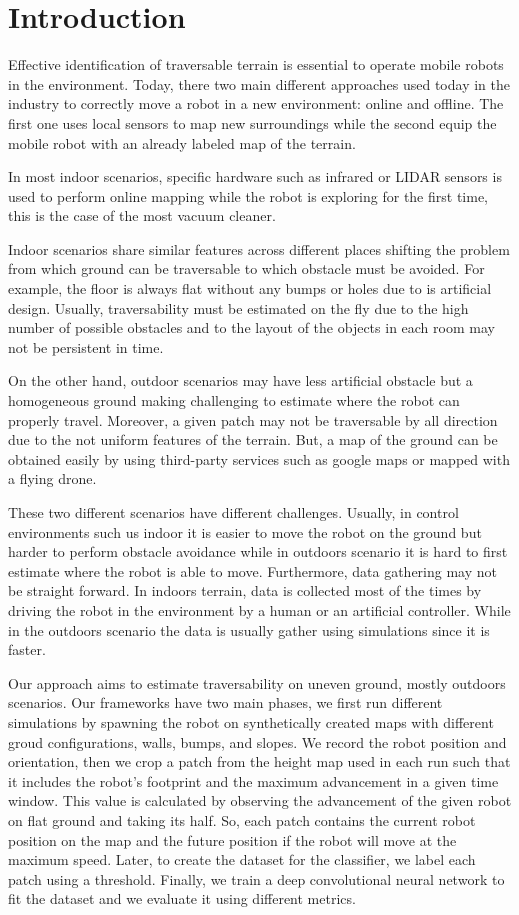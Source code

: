 \documentclass[../document.tex]{subfiles}
\begin{document}
\section{Introduction}
Effective identification of traversable terrain is essential to operate mobile robots in the environment. Today, there two main different approaches
used today in the industry to correctly move a robot in a new environment: online and offline. The first one uses local sensors to map new surroundings while the second equip the mobile robot with an already labeled map of the terrain. 

In most indoor scenarios, specific hardware such as infrared or LIDAR sensors is used to perform online mapping while the robot is exploring for the first time, this is the case of the most vacuum cleaner.  

Indoor scenarios share similar features across different places shifting the problem from which ground can be traversable to which obstacle must be avoided. For example, the floor is always flat without any bumps or holes due to is artificial design. Usually, traversability must be estimated on the fly due to the high number of possible obstacles and to the layout of the objects in each room may not be persistent in time. 

On the other hand, outdoor scenarios may have less artificial obstacle but a homogeneous ground making challenging to estimate where the robot can properly travel. 
Moreover, a given patch may not be traversable by all direction due to the not uniform features of the terrain. But, a map of the ground can be obtained easily by using third-party services such as google maps or mapped with a flying drone. 

These two different scenarios have different challenges. Usually, in control environments such us indoor it is easier to move the robot on the ground but harder to perform obstacle
avoidance while in outdoors scenario it is hard to first estimate where the robot is able to move. 
Furthermore, data gathering may not be straight forward. In indoors terrain, data is collected most of the times by driving the robot in the environment by a human or an artificial
controller. While in the outdoors scenario the data is usually gather using simulations since it is faster. 

Our approach aims to estimate traversability on uneven ground, mostly outdoors scenarios. Our frameworks have two main phases, we first run different simulations by spawning the robot on synthetically
created maps with different groud configurations, walls, bumps, and slopes. We record the robot position and orientation, then we crop a patch from the height map used in each run such that it includes the robot's footprint and the maximum advancement in a given time window. This value is calculated by observing the advancement of the given robot on flat ground and taking its half. So, each patch contains the current robot position on the map and the future position if the robot will move at the maximum speed. Later, to create the dataset for the classifier, we label each patch using a threshold. Finally, we train a deep convolutional neural network to fit the dataset and we evaluate it using different metrics.
\end{document}
